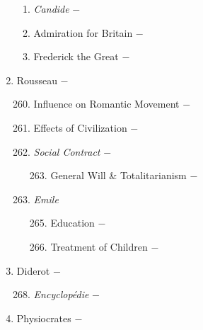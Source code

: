 \documentclass[12pt]{article}
\begin{document}
\begin{enumerate}
\begin{enumerate}[label=\arabic{*}.]
\item \textit{Candide} $-$ 

\item Admiration for Britain $-$ 

\item Frederick the Great $-$

\end{enumerate}
\setcounter{enumi}{258}

\item Rousseau $-$ 

\begin{enumerate}[label=\arabic{*}.]
\setcounter{enumii}{259}

\item Influence on Romantic Movement $-$ 

\item Effects of Civilization $-$

\item \textit{Social Contract} $-$

\begin{enumerate}[label=\arabic{*}.]
\setcounter{enumiii}{262}

\item General Will \& Totalitarianism $-$

\end{enumerate}
\setcounter{enumii}{263}

\item \textit{Emile}

\begin{enumerate}[label=\arabic{*}.]
\setcounter{enumiii}{264}

\item Education $-$ 

\item Treatment of Children $-$

\end{enumerate}
\end{enumerate}
\setcounter{enumi}{266}

\item Diderot $-$ 

\begin{enumerate}[label=\arabic{*}.]
\setcounter{enumii}{267}

\item \textit{Encyclop\'edie} $-$ 

\end{enumerate}
\setcounter{enumi}{268}

\item Physiocrates $-$


\end{enumerate}
\end{document}
